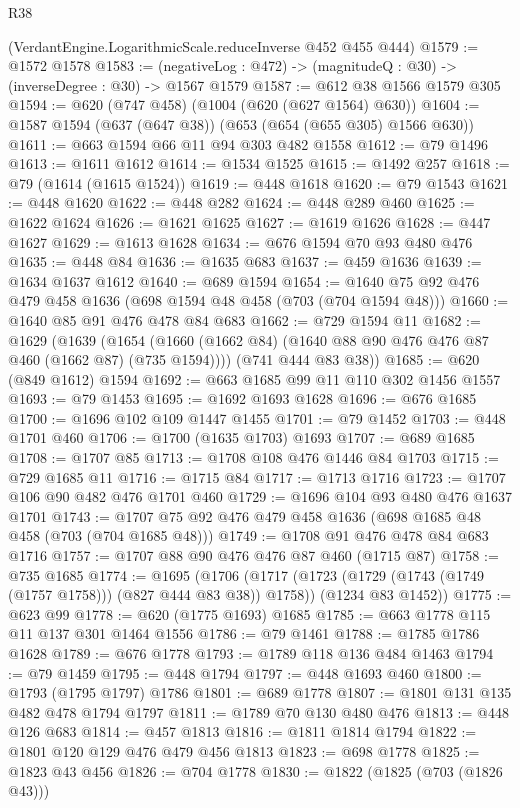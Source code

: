 \begin{lexlean}{R38}
\begin{coremodule}
    (VerdantEngine.LogarithmicScale.reduceInverse @452 @455 @444)
@1579 := @1572 @1578
@1583 := (negativeLog : @472) -> (magnitudeQ : @30) -> (inverseDegree : @30) -> @1567 @1579
@1587 := @612 @38 @1566 @1579 @305
@1594 := @620 (@747 @458) (@1004 (@620 (@627 @1564) @630))
@1604 := @1587 @1594 (@637 (@647 @38)) (@653 (@654 (@655 @305) @1566 @630))
@1611 := @663 @1594 @66 @11 @94 @303 @482 @1558
@1612 := @79 @1496
@1613 := @1611 @1612
@1614 := @1534 @1525
@1615 := @1492 @257
@1618 := @79 (@1614 (@1615 @1524))
@1619 := @448 @1618
@1620 := @79 @1543
@1621 := @448 @1620
@1622 := @448 @282
@1624 := @448 @289 @460
@1625 := @1622 @1624
@1626 := @1621 @1625
@1627 := @1619 @1626
@1628 := @447 @1627
@1629 := @1613 @1628
@1634 := @676 @1594 @70 @93 @480 @476
@1635 := @448 @84
@1636 := @1635 @683
@1637 := @459 @1636
@1639 := @1634 @1637 @1612
@1640 := @689 @1594
@1654 := @1640 @75 @92 @476 @479 @458 @1636 (@698 @1594 @48 @458 (@703 (@704 @1594 @48)))
@1660 := @1640 @85 @91 @476 @478 @84 @683
@1662 := @729 @1594 @11
@1682 := @1629
    (@1639
      (@1654 (@1660 (@1662 @84) (@1640 @88 @90 @476 @476 @87 @460 (@1662 @87) (@735 @1594))))
      (@741 @444 @83 @38))
@1685 := @620 (@849 @1612) @1594
@1692 := @663 @1685 @99 @11 @110 @302 @1456 @1557
@1693 := @79 @1453
@1695 := @1692 @1693 @1628
@1696 := @676 @1685
@1700 := @1696 @102 @109 @1447 @1455
@1701 := @79 @1452
@1703 := @448 @1701 @460
@1706 := @1700 (@1635 @1703) @1693
@1707 := @689 @1685
@1708 := @1707 @85
@1713 := @1708 @108 @476 @1446 @84 @1703
@1715 := @729 @1685 @11
@1716 := @1715 @84
@1717 := @1713 @1716
@1723 := @1707 @106 @90 @482 @476 @1701 @460
@1729 := @1696 @104 @93 @480 @476 @1637 @1701
@1743 := @1707 @75 @92 @476 @479 @458 @1636 (@698 @1685 @48 @458 (@703 (@704 @1685 @48)))
@1749 := @1708 @91 @476 @478 @84 @683 @1716
@1757 := @1707 @88 @90 @476 @476 @87 @460 (@1715 @87)
@1758 := @735 @1685
@1774 := @1695
    (@1706
      (@1717 (@1723 (@1729 (@1743 (@1749 (@1757 @1758))) (@827 @444 @83 @38)) @1758))
      (@1234 @83 @1452))
@1775 := @623 @99
@1778 := @620 (@1775 @1693) @1685
@1785 := @663 @1778 @115 @11 @137 @301 @1464 @1556
@1786 := @79 @1461
@1788 := @1785 @1786 @1628
@1789 := @676 @1778
@1793 := @1789 @118 @136 @484 @1463
@1794 := @79 @1459
@1795 := @448 @1794
@1797 := @448 @1693 @460
@1800 := @1793 (@1795 @1797) @1786
@1801 := @689 @1778
@1807 := @1801 @131 @135 @482 @478 @1794 @1797
@1811 := @1789 @70 @130 @480 @476
@1813 := @448 @126 @683
@1814 := @457 @1813
@1816 := @1811 @1814 @1794
@1822 := @1801 @120 @129 @476 @479 @456 @1813
@1823 := @698 @1778
@1825 := @1823 @43 @456
@1826 := @704 @1778
@1830 := @1822 (@1825 (@703 (@1826 @43)))

\end{coremodule}
\end{lexlean}
